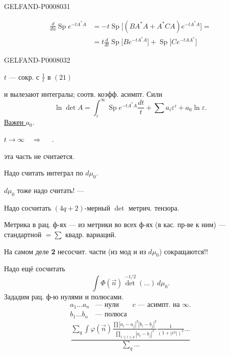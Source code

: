 \begin{GelfandAdjacentEvidence}{GELFAND-P000803}{1}

\begin{equation*}
\begin{aligned}
\frac{d}{du}\operatorname{Sp}e^{-tA^*A}
&=-t\operatorname{Sp}\bigl[(BA^*A+A^*CA)e^{-tA^*A}\bigr]=\\
&=t\frac{d}{dt}\operatorname{Sp}\bigl[Be^{-tA^*A}\bigr]
 +\operatorname{Sp}\bigl[Ce^{-tAA^*}\bigr]
\end{aligned}
\tag{22}
\end{equation*}
\end{GelfandAdjacentEvidence}
\begin{GelfandAdjacentEvidence}{GELFAND-P000803}{2}


\(t\) --- сокр. с \(\frac{1}{t}\) в \((21)\)

и вылезают интегралы; соотв. коэфф. асимпт. Сили
\[
\ln\det A=\int_\varepsilon^\infty\operatorname{Sp}e^{-tA^*A}\frac{dt}{t}
 +\sum a_i\varepsilon^i+a_0\ln\varepsilon.
\]
\underline{\underline{Важен \(a_0\)}}.

\(t\to\infty\quad\Rightarrow\quad\) .

эта часть не считается.

Надо считать интеграл по \(d\mu_0\).

\(d\mu_0\) тоже надо считать! --- 

Надо сосчитать \((4q+2)\)-мерный \(\det\) метрич. тензора.

Метрика в рац. ф-ях --- из метрики во всех ф-ях (в кас. пр-ве к ним) --- стандартной \(=\sum\) квадр. вариаций.

На самом деле \textbf{2} несосчит. части (из мод и из \(d\mu_0\)) сокращаются!!

Надо ещё сосчитать
\[
\int\Phi(\vec n)\det^{-1/2}(\ldots)\,d\mu_0.
\]
Зададим рац. ф-ю нулями и полюсами.
\[
\begin{array}{ll|l}
a_1\ldots a_n&\text{--- нули}&c\text{ --- асимпт. на }\infty.\\
b_1\ldots b_n&\text{--- полюса}&
\end{array}
\]
\[
\frac{
 \displaystyle\sum_q\int\varphi(\vec n)
 \frac{\prod |a_i-a_j|^2|b_i-b_j|^2}
 {\prod_{1\le i\le q}|a_i-b_j|^2}
 \frac{1}{(1+|c^2|)^2}\ldots
}{\displaystyle\sum_q\ldots}
\]
\end{GelfandAdjacentEvidence}
